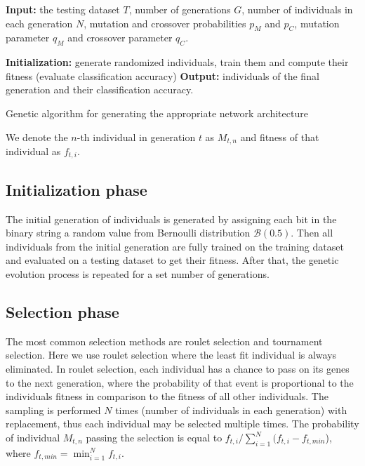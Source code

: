 \documentclass[eng]{simposium}
\begin{document}
\begin{algorithm}[H]
  \SetAlgoLined
  \textbf{Input:} the testing dataset $T$, number of generations $G$, number of individuals in each generation $N$,
  mutation and crossover probabilities $p_M$ and $p_C$, mutation parameter $q_M$ and crossover parameter $q_C$.

  \textbf{Initialization:} generate randomized individuals, train them and compute their fitness (evaluate classification accuracy)\;
   \textbf{Output:} individuals of the final generation and their classification accuracy.
   \caption{Genetic algorithm for generating the appropriate network architecture}
\end{algorithm}


We denote the $n$-th individual in generation $t$ as $M_{t,n}$ and fitness of that individual as $f_{t,i}$.

\subsection{Initialization phase}
The initial generation of individuals is generated by assigning each bit in the binary string a random value from Bernoulli distribution $\mathcal{B}(0.5)$.
Then all individuals from the initial generation are fully trained on the training dataset and evaluated on a testing dataset to get their fitness.
After that, the genetic evolution process is repeated for a set number of generations.

\subsection{Selection phase}
The most common selection methods are roulet selection and tournament selection. 
Here we use roulet selection where the least fit individual is always eliminated.
In roulet selection, each individual has a chance to pass on its genes to the next generation, 
where the probability of that event is proportional to the individuals fitness in comparison to the fitness of all other individuals.
The sampling is performed $N$ times (number of individuals in each generation) with replacement, thus each individual may be selected multiple times.
The probability of individual $M_{t,n}$ passing the selection is equal to $f_{t,i} / \sum_{i=1}^{N} (f_{t,i} - f_{t,min}$), where $f_{t, min} = \min_{i=1}^{N} {f_{t,i}}$.
\end{document}
